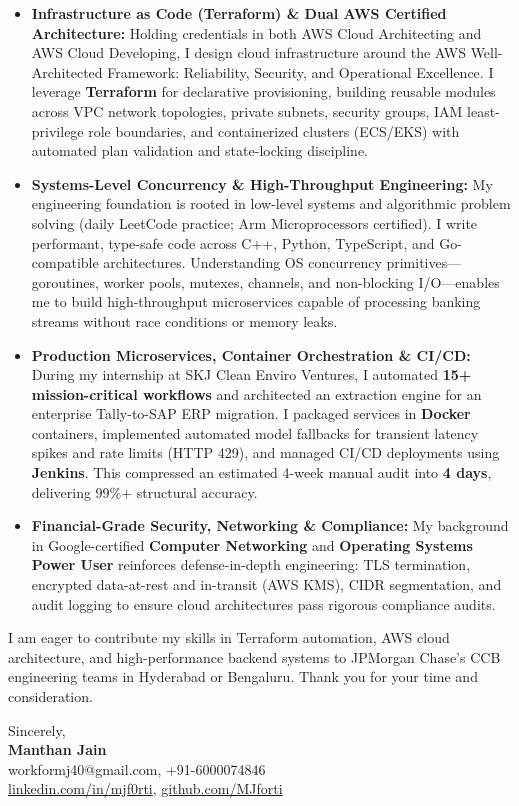 \documentclass[letterpaper,10pt]{article}
\begin{document}
\begin{itemize}[leftmargin=0.18in, itemsep=2.5pt, topsep=2.5pt]
  \item \textbf{Infrastructure as Code (Terraform) \& Dual AWS Certified Architecture:} Holding credentials in both AWS Cloud Architecting and AWS Cloud Developing, I design cloud infrastructure around the AWS Well-Architected Framework: Reliability, Security, and Operational Excellence. I leverage \textbf{Terraform} for declarative provisioning, building reusable modules across VPC network topologies, private subnets, security groups, IAM least-privilege role boundaries, and containerized clusters (ECS/EKS) with automated plan validation and state-locking discipline.

  \item \textbf{Systems-Level Concurrency \& High-Throughput Engineering:} My engineering foundation is rooted in low-level systems and algorithmic problem solving (daily LeetCode practice; Arm Microprocessors certified). I write performant, type-safe code across C++, Python, TypeScript, and Go-compatible architectures. Understanding OS concurrency primitives---goroutines, worker pools, mutexes, channels, and non-blocking I/O---enables me to build high-throughput microservices capable of processing banking streams without race conditions or memory leaks.

  \item \textbf{Production Microservices, Container Orchestration \& CI/CD:} During my internship at SKJ Clean Enviro Ventures, I automated \textbf{15+ mission-critical workflows} and architected an extraction engine for an enterprise Tally-to-SAP ERP migration. I packaged services in \textbf{Docker} containers, implemented automated model fallbacks for transient latency spikes and rate limits (HTTP 429), and managed CI/CD deployments using \textbf{Jenkins}. This compressed an estimated 4-week manual audit into \textbf{4 days}, delivering 99\%+ structural accuracy.

  \item \textbf{Financial-Grade Security, Networking \& Compliance:} My background in Google-certified \textbf{Computer Networking} and \textbf{Operating Systems Power User} reinforces defense-in-depth engineering: TLS termination, encrypted data-at-rest and in-transit (AWS KMS), CIDR segmentation, and audit logging to ensure cloud architectures pass rigorous compliance audits.
\end{itemize}

\vspace{3pt}
I am eager to contribute my skills in Terraform automation, AWS cloud architecture, and high-performance backend systems to JPMorgan Chase's CCB engineering teams in Hyderabad or Bengaluru. Thank you for your time and consideration.

\vspace{8pt}
Sincerely, \\[8pt]
\textbf{Manthan Jain} \\
\small
workformj40@gmail.com, +91-6000074846 \\
\href{https://www.linkedin.com/in/mjf0rti}{linkedin.com/in/mjf0rti}, \href{https://github.com/MJforti}{github.com/MJforti}
\end{document}
